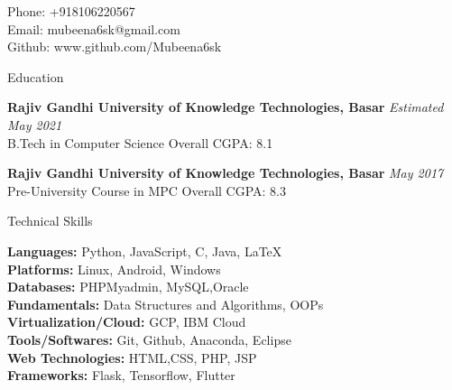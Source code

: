 \documentclass[8pt]{resume} %
\begin{document}
\begin{flushright}
Phone: +918106220567\\
Email: mubeena6sk@gmail.com\\
Github: www.github.com/Mubeena6sk
\end{flushright}

\begin{rSection}{Education}

{\bf Rajiv Gandhi University of Knowledge Technologies, Basar} \hfill {\em Estimated May 2021} \\ 
B.Tech in Computer Science \hfill Overall CGPA: 8.1

{\bf Rajiv Gandhi University of Knowledge Technologies, Basar} \hfill {\em May 2017} \\ 
Pre-University Course in MPC \hfill Overall CGPA: 8.3
\end{rSection}


\begin{rSection}{Technical Skills}

    \begin{multicols}{2}[]
{\bf Languages:} Python, JavaScript, C, Java, \LaTeX \\
{\bf Platforms:} Linux, Android, Windows\\
{\bf Databases:} PHPMyadmin, MySQL,Oracle\\
{\bf Fundamentals:} Data Structures and Algorithms, OOPs\\
{\bf Virtualization/Cloud:} GCP, IBM Cloud\\
{\bf Tools/Softwares:} Git, Github, Anaconda, Eclipse\\
{\bf Web Technologies:} HTML,CSS, PHP, JSP\\
{\bf Frameworks:} Flask, Tensorflow, Flutter
    \end{multicols}
\end{rSection}

\end{document}
